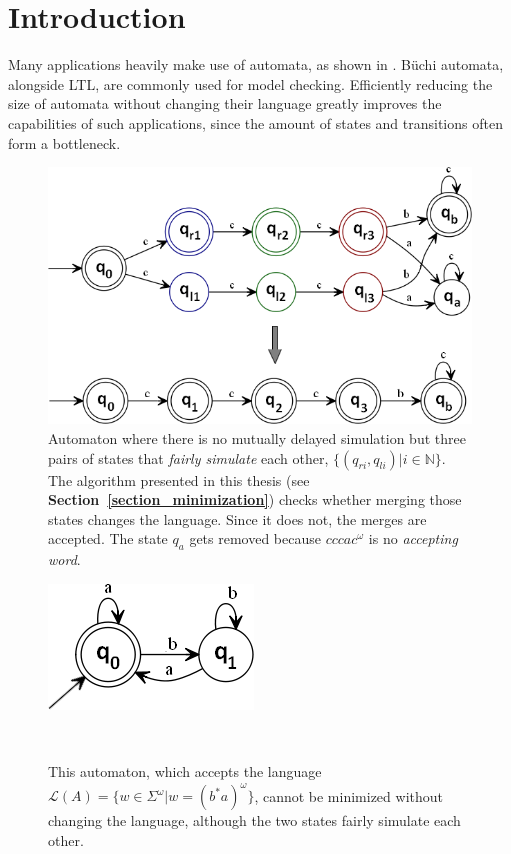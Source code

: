 \documentclass[12pt,oneside,bibliography=totoc,abstracton]{scrartcl}
\newcommand{\sectionref}[1]{\textbf{Section~\ref{#1}}}
\newcommand{\libref}[1]{\textbf{\cite{#1}}}
\begin{document}
\section{Introduction}
Many applications heavily make use of automata, as shown in
\libref{fair_minimization, advanced_minimization, ltl_formulae}.
Büchi automata, alongside LTL, are commonly used for model checking.
Efficiently reducing the size of automata without changing their language
greatly improves the capabilities of such applications, since the
amount of states and transitions often form a bottleneck.\\
\begin{figure}[ht]
	 \begin{center}
		\includegraphics[scale=0.5]{res/fair_nodelayed_merge}
	\end{center}
	\caption{Automaton where there is no mutually delayed simulation
		but three pairs of states that \textit{fairly simulate} each other,
		$\{(q_{ri}, q_{li}) | i \in \mathbb{N}\}$. The algorithm presented in this thesis
		(see \sectionref{section_minimization}) checks whether merging those states changes
		the language. Since it does not, the merges are accepted.
		The state $q_a$ gets removed because $cccac^{\omega}$ is
		no \textit{accepting word}.}
	\label{fair_nodelayed1}
\end{figure}
\begin{figure}
	\begin{center}
		\includegraphics[scale=0.5]{res/fair_fail}
	\end{center}
	\caption{This automaton, which accepts the language
		$\mathcal{L}(A) = \{w \in \Sigma^{\omega} | w = (b^*a)^\omega\}$,
		cannot be minimized without changing the language, although the two
		states fairly simulate each other.}
	\label{fair_fail}\quad\\
\end{figure}
\end{document}

